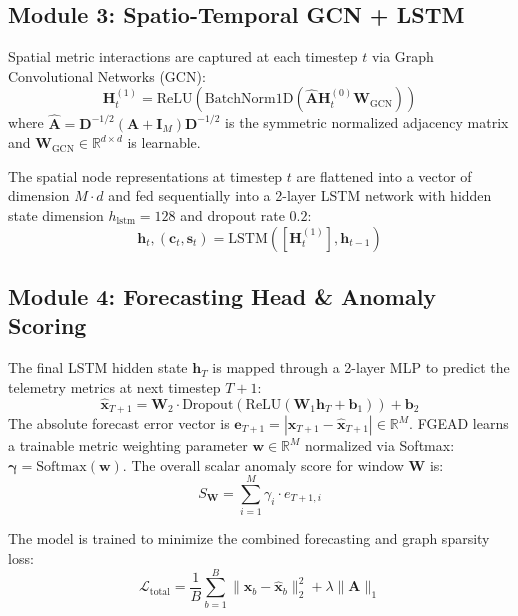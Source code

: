 \documentclass[conference]{IEEEtran}
\begin{document}
\subsection{Module 3: Spatio-Temporal GCN + LSTM}
Spatial metric interactions are captured at each timestep $t$ via Graph Convolutional Networks (GCN):
\begin{equation}
    \mathbf{H}^{(1)}_t = \text{ReLU}\left( \text{BatchNorm1D}\left( \hat{\mathbf{A}} \mathbf{H}^{(0)}_t \mathbf{W}_{\text{GCN}} \right) \right)
\end{equation}
where $\hat{\mathbf{A}} = \mathbf{D}^{-1/2} (\mathbf{A} + \mathbf{I}_M) \mathbf{D}^{-1/2}$ is the symmetric normalized adjacency matrix and $\mathbf{W}_{\text{GCN}} \in \mathbb{R}^{d \times d}$ is learnable.

The spatial node representations at timestep $t$ are flattened into a vector of dimension $M \cdot d$ and fed sequentially into a 2-layer LSTM network with hidden state dimension $h_{\text{lstm}} = 128$ and dropout rate $0.2$:
\begin{equation}
    \mathbf{h}_t, (\mathbf{c}_t, \mathbf{s}_t) = \text{LSTM}\left( [\mathbf{H}^{(1)}_t], \mathbf{h}_{t-1} \right)
\end{equation}

\subsection{Module 4: Forecasting Head \& Anomaly Scoring}
The final LSTM hidden state $\mathbf{h}_T$ is mapped through a 2-layer MLP to predict the telemetry metrics at next timestep $T+1$:
\begin{equation}
    \hat{\mathbf{x}}_{T+1} = \mathbf{W}_2 \cdot \text{Dropout}\left( \text{ReLU}(\mathbf{W}_1 \mathbf{h}_T + \mathbf{b}_1) \right) + \mathbf{b}_2
\end{equation}
The absolute forecast error vector is $\mathbf{e}_{T+1} = |\mathbf{x}_{T+1} - \hat{\mathbf{x}}_{T+1}| \in \mathbb{R}^M$. FGEAD learns a trainable metric weighting parameter $\mathbf{w} \in \mathbb{R}^M$ normalized via Softmax: $\boldsymbol{\gamma} = \text{Softmax}(\mathbf{w})$. The overall scalar anomaly score for window $\mathbf{W}$ is:
\begin{equation}
    S_{\mathbf{W}} = \sum_{i=1}^M \gamma_i \cdot e_{T+1, i}
\end{equation}

The model is trained to minimize the combined forecasting and graph sparsity loss:
\begin{equation}
    \mathcal{L}_{\text{total}} = \frac{1}{B}\sum_{b=1}^B \|\mathbf{x}_b - \hat{\mathbf{x}}_b\|_2^2 + \lambda \|\mathbf{A}\|_1
\end{equation}
\end{document}
